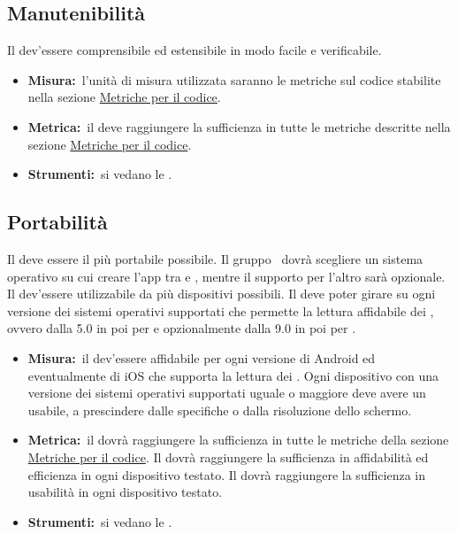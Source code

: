 	\subsection{Manutenibilità}
	\label{manutenibilita}
		Il  dev'essere comprensibile ed estensibile in modo facile e verificabile.
		\begin{itemize}
			\item \textbf{Misura:}\ l'unità di misura utilizzata saranno le metriche sul codice stabilite nella sezione \hyperref[metrichePerIlCodice]{Metriche per il codice}.
			\item \textbf{Metrica:}\ il  deve raggiungere la sufficienza in tutte le metriche descritte nella sezione \hyperref[metrichePerIlCodice]{Metriche per il codice}.
			\item \textbf{Strumenti:}\ si vedano le \NPdoc.
		\end{itemize}
	\subsection{Portabilità}
	\label{portabilita}
		Il  deve essere il più portabile possibile. Il gruppo \AUTORE\ dovrà scegliere un sistema operativo su cui creare l'app tra  e , mentre il supporto per l'altro sarà opzionale. Il  dev'essere utilizzabile da più dispositivi possibili. Il  deve poter girare su ogni versione dei sistemi operativi supportati che permette la lettura affidabile dei , ovvero dalla 5.0 in poi per  e opzionalmente dalla 9.0 in poi per .
		\begin{itemize}
			\item \textbf{Misura:}\ il  dev'essere affidabile per ogni versione di Android ed eventualmente di iOS che supporta la lettura dei . Ogni dispositivo con una versione dei sistemi operativi supportati uguale o maggiore deve avere un  usabile, a prescindere dalle specifiche  o dalla risoluzione dello schermo.
			\item \textbf{Metrica:}\ il  dovrà raggiungere la sufficienza in tutte le metriche della sezione \hyperref[metrichePerIlCodice]{Metriche per il codice}. Il  dovrà raggiungere la sufficienza in affidabilità ed efficienza in ogni dispositivo testato. Il  dovrà raggiungere la sufficienza in usabilità in ogni dispositivo testato.
			\item \textbf{Strumenti:}\ si vedano le \NPdoc.
		\end{itemize}
